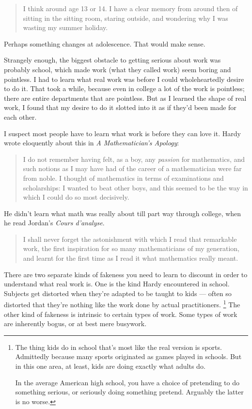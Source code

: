 \documentclass[12pt]{book}
\begin{document}
\begin{quote}
I think around age 13 or 14. I have a clear memory from around then of
sitting in the sitting room, staring outside, and wondering why I was
wasting my summer holiday.
\end{quote}

Perhaps something changes at adolescence. That would make sense.

Strangely enough, the biggest obstacle to getting serious about work was
probably school, which made work (what they called work) seem boring and
pointless. I had to learn what real work was before I could
wholeheartedly desire to do it. That took a while, because even in
college a lot of the work is pointless; there are entire departments
that are pointless. But as I learned the shape of real work, I found
that my desire to do it slotted into it as if they'd been made for each
other.

I suspect most people have to learn what work is before they can love
it. Hardy wrote eloquently about this in \emph{A Mathematician's
Apology}:

\begin{quote}
I do not remember having felt, as a boy, any \emph{passion} for
mathematics, and such notions as I may have had of the career of a
mathematician were far from noble. I thought of mathematics in terms of
examinations and scholarships: I wanted to beat other boys, and this
seemed to be the way in which I could do so most decisively.
\end{quote}

He didn't learn what math was really about till part way through
college, when he read Jordan's \emph{Cours d'analyse}.

\begin{quote}
I shall never forget the astonishment with which I read that remarkable
work, the first inspiration for so many mathematicians of my generation,
and learnt for the first time as I read it what mathematics really
meant.
\end{quote}

There are two separate kinds of fakeness you need to learn to discount
in order to understand what real work is. One is the kind Hardy
encountered in school. Subjects get distorted when they're adapted to be
taught to kids --- often so distorted that they're nothing like the work
done by actual practitioners. \footnote{The thing kids do in school that's most like the real version is
sports. Admittedly because many sports originated as games played in
schools. But in this one area, at least, kids are doing exactly what
adults do.

In the average American high school, you have a choice of pretending to
do something serious, or seriously doing something pretend. Arguably the
latter is no worse.} The other kind of
fakeness is intrinsic to certain types of work. Some types of work are
inherently bogus, or at best mere busywork.
\end{document}
